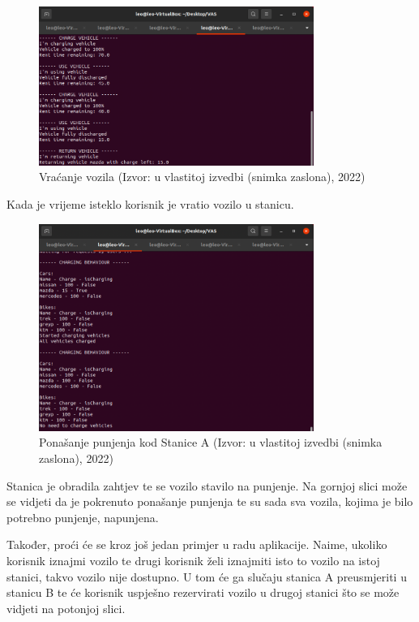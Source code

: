 \documentclass{foi}
\begin{document}
\begin{figure}[H]
	\centering
	\includegraphics[width=0.8\textwidth]{slike/vas9}
	\caption{Vraćanje vozila (Izvor: u vlastitoj izvedbi (snimka zaslona), 2022)}
\end{figure}

Kada je vrijeme isteklo korisnik je vratio vozilo u stanicu.

\pagebreak

\begin{figure}[H]
	\centering
	\includegraphics[width=0.8\textwidth]{slike/vas10}
	\caption{Ponašanje punjenja kod Stanice A (Izvor: u vlastitoj izvedbi (snimka zaslona), 2022)}
\end{figure}

Stanica je obradila zahtjev te se vozilo stavilo na punjenje. Na gornjoj slici može se vidjeti da je pokrenuto ponašanje punjenja te su sada sva vozila, kojima je bilo potrebno punjenje, napunjena.

Također, proći će se kroz još jedan primjer u radu aplikacije. Naime, ukoliko korisnik iznajmi vozilo te drugi korisnik želi iznajmiti isto to vozilo na istoj stanici, takvo vozilo nije dostupno. U tom će ga slučaju stanica A preusmjeriti u stanicu B te će korisnik uspješno rezervirati vozilo u drugoj stanici što se može vidjeti na potonjoj slici.
\end{document}
